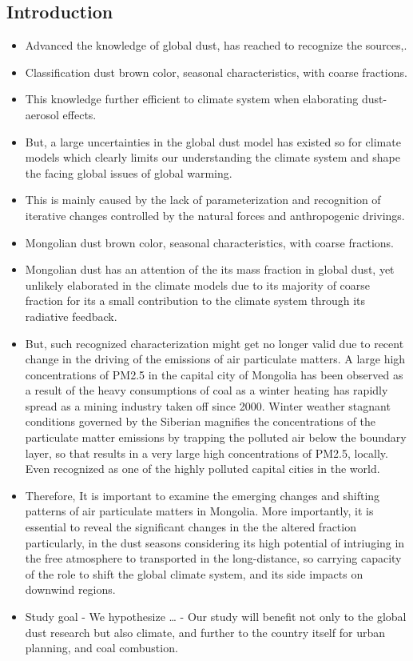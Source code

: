 \documentclass[
  11pt,
]{article}
\begin{document}
\newpage

\subsection{Introduction}\label{introduction}

\begin{itemize}
\item
  Advanced the knowledge of global dust, has reached to recognize the
  sources,.
\item
  Classification dust brown color, seasonal characteristics, with coarse
  fractions.
\item
  This knowledge further efficient to climate system when elaborating
  dust-aerosol effects.
\item
  But, a large uncertainties in the global dust model has existed so for
  climate models which clearly limits our understanding the climate
  system and shape the facing global issues of global warming.
\item
  This is mainly caused by the lack of parameterization and recognition
  of iterative changes controlled by the natural forces and
  anthropogenic drivings.
\item
  Mongolian dust brown color, seasonal characteristics, with coarse
  fractions.
\item
  Mongolian dust has an attention of the its mass fraction in global
  dust, yet unlikely elaborated in the climate models due to its
  majority of coarse fraction for its a small contribution to the
  climate system through its radiative feedback.
\item
  But, such recognized characterization might get no longer valid due to
  recent change in the driving of the emissions of air particulate
  matters. A large high concentrations of PM2.5 in the capital city of
  Mongolia has been observed as a result of the heavy consumptions of
  coal as a winter heating has rapidly spread as a mining industry taken
  off since 2000. Winter weather stagnant conditions governed by the
  Siberian magnifies the concentrations of the particulate matter
  emissions by trapping the polluted air below the boundary layer, so
  that results in a very large high concentrations of PM2.5, locally.
  Even recognized as one of the highly polluted capital cities in the
  world.
\item
  Therefore, It is important to examine the emerging changes and
  shifting patterns of air particulate matters in Mongolia. More
  importantly, it is essential to reveal the significant changes in the
  the altered fraction particularly, in the dust seasons considering its
  high potential of intriuging in the free atmosphere to transported in
  the long-distance, so carrying capacity of the role to shift the
  global climate system, and its side impacts on downwind regions.
\item
  Study goal - We hypothesize \ldots{} - Our study will benefit not only
  to the global dust research but also climate, and further to the
  country itself for urban planning, and coal combustion.
\end{itemize}
\end{document}
